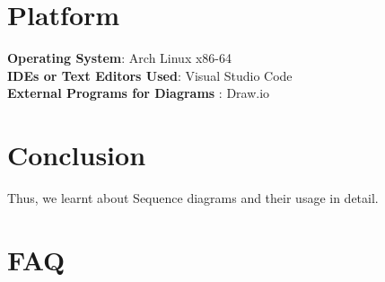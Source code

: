 \documentclass[11pt]{article}
\begin{document}
\clearpage

\section{Platform}
\textbf{Operating System}: Arch Linux x86-64 \\
\textbf{IDEs or Text Editors Used}: Visual Studio Code\\
\textbf{External Programs for Diagrams} : Draw.io\\


\section{Conclusion}
Thus, we learnt about Sequence diagrams and their usage in detail.
\clearpage

\section{FAQ}
\end{document}
